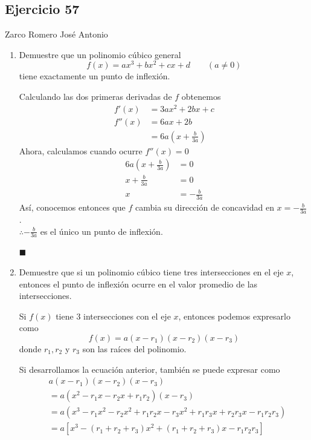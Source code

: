 \documentclass[12pt]{article}
\begin{document}
\subsection{Ejercicio 57} Zarco Romero José Antonio \\

\begin{enumerate}[label=(\alph*)]
\item Demuestre que un polinomio cúbico general
  \[
  f(x) = ax^3 + bx^2 + cx + d \qquad (a\neq 0)
  \]
  tiene exactamente un punto de inflexión.

  Calculando las dos primeras derivadas de $f$ obtenemos
  \begin{align*}
    f'(x)
    &= 3ax^2 + 2bx +c \\
    f''(x)
    &= 6ax +2b \\
    &= 6a\left(x+\frac{b}{3a}\right)
  \end{align*}
  Ahora, calculamos cuando ocurre $f''(x)=0$
  \begin{align*}
    6a\left(x+\frac{b}{3a}\right)
    &= 0\\
    x+\frac{b}{3a}
    &= 0 \\
    x
    &= -\frac{b}{3a}
  \end{align*}
  Así, conocemos entonces que $f$ cambia su dirección de concavidad en $x=-\frac{b}{3a}$. \\ 
  $\therefore -\frac{b}{3a}$ es el único un punto de inflexión.
  \
  \begin{flushright}
    $\blacksquare$
  \end{flushright}

\item Demuestre que si un polinomio cúbico tiene tres intersecciones en el eje $x$, entonces el punto de inflexión ocurre en el valor promedio de las intersecciones.

  Si $f(x)$ tiene 3 intersecciones con el eje $x$, entonces podemos expresarlo como
  \[
  f(x)=a(x-r_1​)(x-r_2​)(x-r_3​)
  \]
  donde $r_1,r_2$ y $r_3​$ son las raíces del polinomio.
  
  Si desarrollamos la ecuación anterior, también se puede expresar como
  \begin{align*}
    & a(x-r_1​)(x-r_2​)(x-r_3​) \\
    & = a(x^2-r_1x-r_2x+r_1r_2)(x-r_3) \\
    & = a(x^3-r_1x^2-r_2x^2+r_1r_2x-r_3x^2+r_1r_3x+r_2r_3x-r_1r_2r_3) \\
    & = a[x^3-(r_1+r_2+r_3)x^2+(r_1+r_2+r_3)x-r_1r_2r_3]
  \end{align*}


\end{enumerate}
\end{document}

